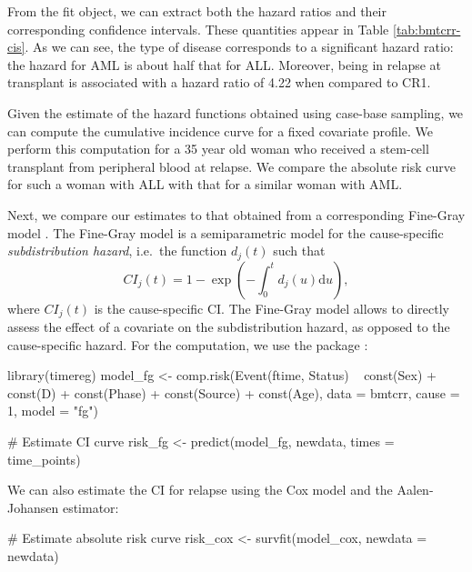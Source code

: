 From the fit object, we can extract both the hazard ratios and their
corresponding confidence intervals. These quantities appear in Table
\ref{tab:bmtcrr-cis}. As we can see, the type of disease corresponds to
a significant hazard ratio: the hazard for AML is about half that for
ALL. Moreover, being in relapse at transplant is associated with a
hazard ratio of 4.22 when compared to CR1.

Given the estimate of the hazard functions obtained using case-base
sampling, we can compute the cumulative incidence curve for a fixed
covariate profile. We perform this computation for a 35 year old woman
who received a stem-cell transplant from peripheral blood at relapse. We
compare the absolute risk curve for such a woman with ALL with that for
a similar woman with AML.

Next, we compare our estimates to that obtained from a corresponding
Fine-Gray model \citeyearpar{fine1999proportional}. The Fine-Gray model
is a semiparametric model for the cause-specific \emph{subdistribution
hazard}, i.e.~the function \(d_j(t)\) such that
\[CI_j(t) = 1 - \exp\left( - \int_0^t d_j(u) \textrm{d}u \right),\]
where \(CI_j(t)\) is the cause-specific CI. The Fine-Gray model allows
to directly assess the effect of a covariate on the subdistribution
hazard, as opposed to the cause-specific hazard. For the computation, we
use the  package \citep{timereg}:

\begin{Schunk}
\begin{Sinput}
library(timereg)
model_fg <- comp.risk(Event(ftime, Status) ~ const(Sex) + const(D) +
                        const(Phase) + const(Source) + const(Age),
                      data = bmtcrr, cause = 1, model = "fg")

# Estimate CI curve
risk_fg <- predict(model_fg, newdata, times = time_points)
\end{Sinput}
\end{Schunk}

We can also estimate the CI for relapse using the Cox model and the
Aalen-Johansen estimator:

\begin{Schunk}
\begin{Sinput}
# Estimate absolute risk curve
risk_cox <- survfit(model_cox, newdata = newdata)
\end{Sinput}
\end{Schunk}

